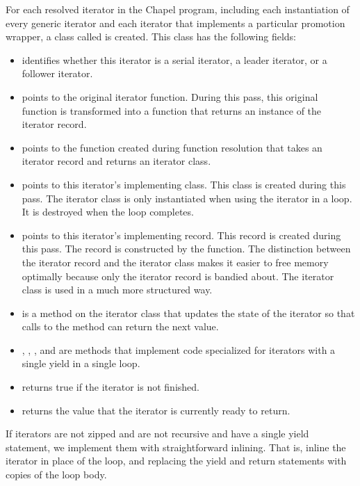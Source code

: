 \documentclass[10pt]{article}
\begin{document}
For each resolved iterator in the Chapel program, including each
instantiation of every generic iterator and each iterator that
implements a particular promotion wrapper, a class called
 is created.  This class has the following fields:
\begin{itemize}
\item {} identifies whether this iterator is a
  serial iterator, a leader iterator, or a follower iterator.
\item {} points to the original iterator
  function.  During this pass, this original function is transformed
  into a function that returns an instance of the iterator record.
\item {} points to the 
  function created during function resolution that takes an iterator
  record and returns an iterator class.
\item {} points to this iterator's implementing
  class.  This class is created during this pass.  The iterator class
  is only instantiated when using the iterator in a loop.  It is
  destroyed when the loop completes.
\item {} points to this iterator's implementing
  record.  This record is created during this pass.  The record is
  constructed by the  function.  The distinction
  between the iterator record and the iterator class makes it easier
  to free memory optimally because only the iterator record is bandied
  about.  The iterator class is used in a much more structured way.
\item {} is a method on the iterator class that
  updates the state of the iterator so that calls to the 
  method can return the next value.
\item {}, , ,
  and  are methods that implement code specialized
  for iterators with a single yield in a single loop.
\item {} returns true if the iterator is not
  finished.
\item {} returns the value that the iterator is
  currently ready to return.
\end{itemize}

If iterators are not zipped and are not recursive and have a single
yield statement, we implement them with straightforward inlining.
That is, inline the iterator in place of the loop, and replacing the
yield and return statements with copies of the loop body.
\end{document}
